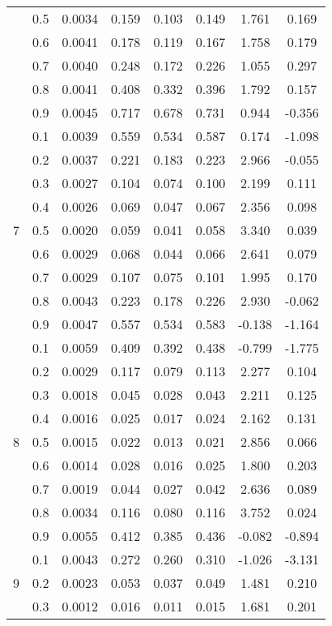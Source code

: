 \documentclass[11pt,a4paper]{report}
\begin{document}
\begin{longtable}{ | c | c || c | c | c | c | c | c | }
 & 0.5 & 0.0034 & 0.159 & 0.103 & 0.149 & 1.761 & 0.169 \\
 & 0.6 & 0.0041 & 0.178 & 0.119 & 0.167 & 1.758 & 0.179 \\
 & 0.7 & 0.0040 & 0.248 & 0.172 & 0.226 & 1.055 & 0.297 \\
 & 0.8 & 0.0041 & 0.408 & 0.332 & 0.396 & 1.792 & 0.157 \\
 & 0.9 & 0.0045 & 0.717 & 0.678 & 0.731 & 0.944 & -0.356 \\
 \hline
\multirow{9}{*}{7} & 0.1 & 0.0039 & 0.559 & 0.534 & 0.587 & 0.174 & -1.098 \\
 & 0.2 & 0.0037 & 0.221 & 0.183 & 0.223 & 2.966 & -0.055 \\
 & 0.3 & 0.0027 & 0.104 & 0.074 & 0.100 & 2.199 & 0.111 \\
 & 0.4 & 0.0026 & 0.069 & 0.047 & 0.067 & 2.356 & 0.098 \\
 & 0.5 & 0.0020 & 0.059 & 0.041 & 0.058 & 3.340 & 0.039 \\
 & 0.6 & 0.0029 & 0.068 & 0.044 & 0.066 & 2.641 & 0.079 \\
 & 0.7 & 0.0029 & 0.107 & 0.075 & 0.101 & 1.995 & 0.170 \\
 & 0.8 & 0.0043 & 0.223 & 0.178 & 0.226 & 2.930 & -0.062 \\
 & 0.9 & 0.0047 & 0.557 & 0.534 & 0.583 & -0.138 & -1.164 \\
 \hline
\multirow{9}{*}{8} & 0.1 & 0.0059 & 0.409 & 0.392 & 0.438 & -0.799 & -1.775 \\
 & 0.2 & 0.0029 & 0.117 & 0.079 & 0.113 & 2.277 & 0.104 \\
 & 0.3 & 0.0018 & 0.045 & 0.028 & 0.043 & 2.211 & 0.125 \\
 & 0.4 & 0.0016 & 0.025 & 0.017 & 0.024 & 2.162 & 0.131 \\
 & 0.5 & 0.0015 & 0.022 & 0.013 & 0.021 & 2.856 & 0.066 \\
 & 0.6 & 0.0014 & 0.028 & 0.016 & 0.025 & 1.800 & 0.203 \\
 & 0.7 & 0.0019 & 0.044 & 0.027 & 0.042 & 2.636 & 0.089 \\
 & 0.8 & 0.0034 & 0.116 & 0.080 & 0.116 & 3.752 & 0.024 \\
 & 0.9 & 0.0055 & 0.412 & 0.385 & 0.436 & -0.082 & -0.894 \\
 \hline
\multirow{9}{*}{9} & 0.1 & 0.0043 & 0.272 & 0.260 & 0.310 & -1.026 & -3.131 \\
 & 0.2 & 0.0023 & 0.053 & 0.037 & 0.049 & 1.481 & 0.210 \\
 & 0.3 & 0.0012 & 0.016 & 0.011 & 0.015 & 1.681 & 0.201 \\

\end{longtable}
\end{document}
